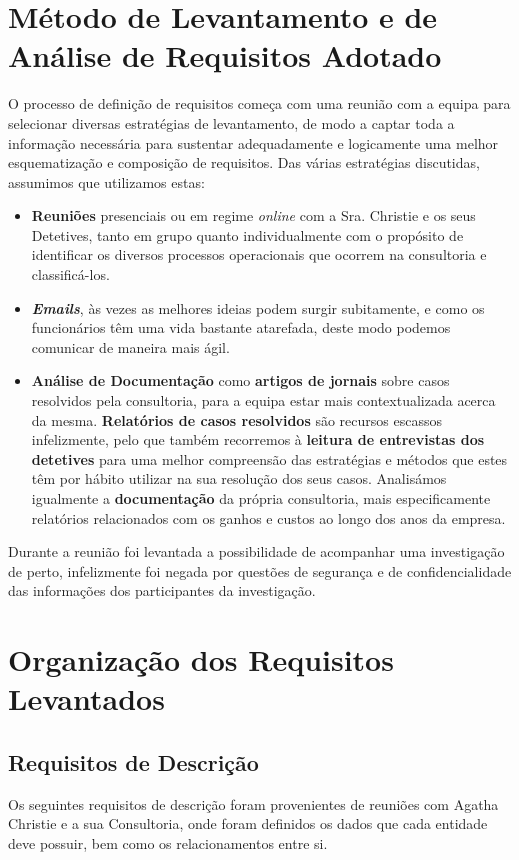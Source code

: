\documentclass[a4paper,12pt]{scrreprt}
\begin{document}
    \section{Método de Levantamento e de Análise de Requisitos Adotado}
        \label{sec:2.1}
            O processo de definição de requisitos começa com uma reunião com a equipa para selecionar diversas estratégias de levantamento, de modo a captar toda a informação necessária para sustentar adequadamente e logicamente uma melhor esquematização e composição de requisitos. Das várias estratégias discutidas, assumimos que utilizamos estas:
            \begin{itemize}
            \item \textbf{Reuniões} presenciais ou em regime \textit{online} com a Sra$.$ Christie e os seus Detetives, tanto em grupo quanto individualmente com o propósito de identificar os diversos processos operacionais que ocorrem na consultoria e classificá-los.
            \item \textit{\textbf{Emails}}, às vezes as melhores ideias podem surgir subitamente, e como os funcionários têm uma vida bastante atarefada, deste modo podemos comunicar de maneira mais ágil.
            \item \textbf{Análise de Documentação} como \textbf{artigos de jornais} sobre casos resolvidos pela consultoria, para a equipa estar mais contextualizada acerca da mesma.
            \textbf{Relatórios de casos resolvidos} são recursos escassos infelizmente, pelo que também recorremos à \textbf{leitura de entrevistas dos detetives} para uma melhor compreensão das estratégias e métodos que estes têm por hábito utilizar na sua resolução dos seus casos. Analisámos igualmente a \textbf{documentação} da própria consultoria, mais especificamente relatórios relacionados com os ganhos e custos ao longo dos anos da empresa.
            \end{itemize}
            
            Durante a reunião foi levantada a possibilidade de acompanhar uma investigação de perto, infelizmente foi negada por questões de segurança e de confidencialidade das informações dos participantes da investigação. 

    \section{Organização dos Requisitos Levantados}
        \label{sec:2.2}
        \subsection{Requisitos de Descrição}
        Os seguintes requisitos de descrição foram provenientes de reuniões com Agatha Christie e a sua Consultoria, onde foram definidos os dados que cada entidade deve possuir, bem como os relacionamentos entre si.
\end{document}
